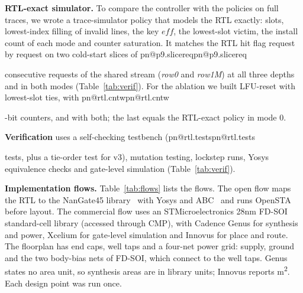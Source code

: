\documentclass[conference,10pt]{IEEEtran}
\makeatletter
\newcommand{\R}[1]{\ifcsname pn@#1\endcsname\csname pn@#1\endcsname\else
  \PackageError{paper}{number key '#1' is not defined in macros.tex}{Run tools/make_paper_macros.py}\fi}
\newcommand{\umsq}{\textmu m\textsuperscript{2}}
\makeatother
\begin{document}
\textbf{RTL-exact simulator.} To compare the controller with the policies on full traces, we wrote a trace-simulator
policy that models the RTL exactly: slots, lowest-index filling of invalid lines, the key $\mathit{eff}$, the
lowest-slot victim, the install count of each mode and counter saturation. It matches the RTL hit flag request by
request on two cold-start slices of \R{p9.slicereq} consecutive requests of the shared stream (\emph{row0} and
\emph{row1M}) at all three depths and in both modes (Table~\ref{tab:verif}). For the ablation we built LFU-reset with
lowest-slot ties, with \R{rtl.cntw}-bit counters, and with both; the last equals the RTL-exact policy in mode 0.

\textbf{Verification} uses a self-checking testbench (\R{rtl.tests} tests, plus a tie-order test for v3), mutation
testing, lockstep runs, Yosys equivalence checks and gate-level simulation (Table~\ref{tab:verif}).

\textbf{Implementation flows.} Table~\ref{tab:flows} lists the flows. The open flow maps the RTL to the NanGate45
library~\cite{nangate45} with Yosys and ABC~\cite{wolf_yosys,brayton2010abc} and runs OpenSTA~\cite{opensta} before
layout. The commercial flow uses an STMicroelectronics 28nm FD-SOI standard-cell library (accessed through CMP), with
Cadence Genus for synthesis and power, Xcelium for gate-level simulation and Innovus for place and route. The
floorplan has end caps, well taps and a four-net power grid: supply, ground and the two body-bias nets of FD-SOI,
which connect to the well taps. Genus states no area unit, so synthesis areas are in library units; Innovus reports
\umsq{}. Each design point was run once.
\end{document}
